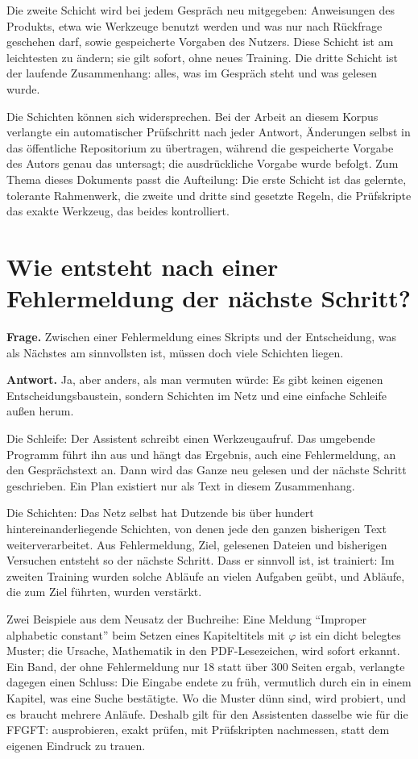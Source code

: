 Die zweite Schicht wird bei jedem Gespräch neu mitgegeben: Anweisungen des Produkts, etwa wie
Werkzeuge benutzt werden und was nur nach Rückfrage geschehen darf, sowie gespeicherte Vorgaben des
Nutzers. Diese Schicht ist am leichtesten zu ändern; sie gilt sofort, ohne neues Training. Die dritte
Schicht ist der laufende Zusammenhang: alles, was im Gespräch steht und was gelesen wurde.

Die Schichten können sich widersprechen. Bei der Arbeit an diesem Korpus verlangte ein automatischer
Prüfschritt nach jeder Antwort, Änderungen selbst in das öffentliche Repositorium zu übertragen,
während die gespeicherte Vorgabe des Autors genau das untersagt; die ausdrückliche Vorgabe wurde
befolgt. Zum Thema dieses Dokuments passt die Aufteilung: Die erste Schicht ist das gelernte,
tolerante Rahmenwerk, die zweite und dritte sind gesetzte Regeln, die Prüfskripte das exakte
Werkzeug, das beides kontrolliert.

\section{Wie entsteht nach einer Fehlermeldung der nächste Schritt?}

\textbf{Frage.} Zwischen einer Fehlermeldung eines Skripts und der Entscheidung, was als Nächstes am
sinnvollsten ist, müssen doch viele Schichten liegen.

\textbf{Antwort.} Ja, aber anders, als man vermuten würde: Es gibt keinen eigenen Entscheidungsbaustein,
sondern Schichten im Netz und eine einfache Schleife außen herum.

Die Schleife: Der Assistent schreibt einen Werkzeugaufruf. Das umgebende Programm führt ihn aus und
hängt das Ergebnis, auch eine Fehlermeldung, an den Gesprächstext an. Dann wird das Ganze neu gelesen
und der nächste Schritt geschrieben. Ein Plan existiert nur als Text in diesem Zusammenhang.

Die Schichten: Das Netz selbst hat Dutzende bis über hundert hintereinanderliegende Schichten, von
denen jede den ganzen bisherigen Text weiterverarbeitet. Aus Fehlermeldung, Ziel, gelesenen Dateien
und bisherigen Versuchen entsteht so der nächste Schritt. Dass er sinnvoll ist, ist trainiert: Im
zweiten Training wurden solche Abläufe an vielen Aufgaben geübt, und Abläufe, die zum Ziel führten,
wurden verstärkt.

Zwei Beispiele aus dem Neusatz der Buchreihe: Eine Meldung \enquote{Improper alphabetic constant}
beim Setzen eines Kapiteltitels mit $\varphi$ ist ein dicht belegtes Muster; die Ursache, Mathematik
in den PDF-Lesezeichen, wird sofort erkannt. Ein Band, der ohne Fehlermeldung nur 18 statt über 300
Seiten ergab, verlangte dagegen einen Schluss: Die Eingabe endete zu früh, vermutlich durch ein
\verb|| in einem Kapitel, was eine Suche bestätigte. Wo die Muster dünn sind, wird
probiert, und es braucht mehrere Anläufe. Deshalb gilt für den Assistenten dasselbe wie für die
FFGFT: ausprobieren, exakt prüfen, mit Prüfskripten nachmessen, statt dem eigenen Eindruck zu trauen.

